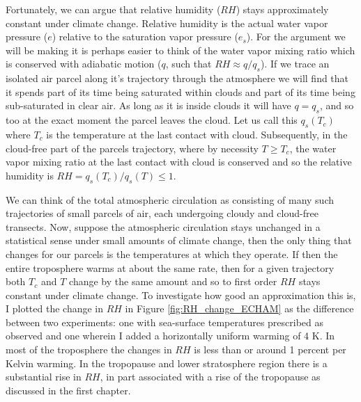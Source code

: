 \documentclass[12pt]{book}
\begin{document}
Fortunately, we can argue that relative humidity ($RH$) stays approximately constant under climate change. Relative humidity is the actual water vapor pressure ($e$) relative to the saturation vapor pressure ($e_s$). For the argument we will be making it is perhaps easier to think of the water vapor mixing ratio which is conserved with adiabatic motion ($q$, such that $RH \approx q/q_s$). If we trace an isolated air parcel along it's trajectory through the atmosphere we will find that it spends part of its time being saturated within clouds and part of its time being sub-saturated in clear air. As long as it is inside clouds it will have $q=q_s$, and so too at the exact moment the parcel leaves the cloud. Let us call this $q_s(T_c)$ where $T_c$ is the temperature at the last contact with cloud. Subsequently, in the cloud-free part of the parcels trajectory, where by necessity $T \ge T_c$, the water vapor mixing ratio at the last contact with cloud is conserved and so the relative humidity is $RH = q_s(T_c)/q_s(T) \le 1$. 

We can think of the total atmospheric circulation as consisting of many such trajectories of small parcels of air, each undergoing cloudy and cloud-free transects. Now, suppose the atmospheric circulation stays unchanged in a statistical sense under small amounts of climate change, then the only thing that changes for our parcels is the temperatures at which they operate. If then the entire troposphere warms at about the same rate, then for a given trajectory both $T_c$ and $T$ change by the same amount and so to first order $RH$ stays constant under climate change. To investigate how good an approximation this is, I plotted the change in $RH$ in Figure \ref{fig:RH_change_ECHAM} as the difference between two experiments: one with sea-surface temperatures prescribed as observed and one wherein I added a horizontally uniform warming of 4 K. In most of the troposphere the changes in $RH$ is less than or around 1 percent per Kelvin warming. In the tropopause and lower stratosphere region there is a substantial rise in $RH$, in part associated with a rise of the tropopause as discussed in the first chapter.
\end{document}
